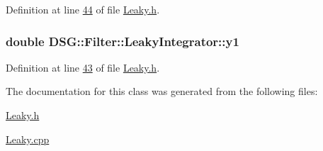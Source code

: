 Definition at line \hyperlink{_leaky_8h_source_l00044}{44} of file \hyperlink{_leaky_8h_source}{Leaky.\+h}.

\hypertarget{class_d_s_g_1_1_filter_1_1_leaky_integrator_a338246cc32a709070753696cf827624c}{
\subsubsection[{y1}]{\setlength{\rightskip}{0pt plus 5cm}double D\+S\+G\+::\+Filter\+::\+Leaky\+Integrator\+::y1\hspace{0.3cm}{\ttfamily [protected]}}}\label{class_d_s_g_1_1_filter_1_1_leaky_integrator_a338246cc32a709070753696cf827624c}


Definition at line \hyperlink{_leaky_8h_source_l00043}{43} of file \hyperlink{_leaky_8h_source}{Leaky.\+h}.



The documentation for this class was generated from the following files\+:\begin{DoxyCompactItemize}
\item 
\hyperlink{_leaky_8h}{Leaky.\+h}\item 
\hyperlink{_leaky_8cpp}{Leaky.\+cpp}\end{DoxyCompactItemize}
